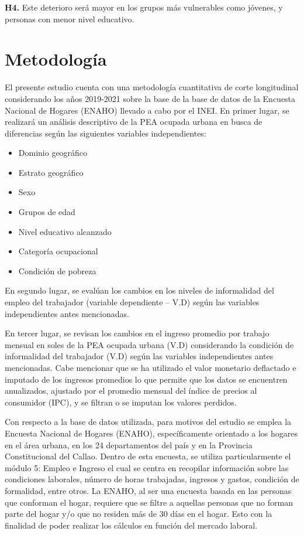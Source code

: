 \documentclass[
  letterpaper,
  12pt,
  oneside,
  spanish,
  doublespacing,
  headsepline,
  parskip]{MastersDoctoralThesis}
\begin{document}
\textbf{H4.} Este deterioro será mayor en los grupos más vulnerables
como jóvenes, y personas con menor nivel educativo.


\hypertarget{sec-metod}{%
\chapter{Metodología}\label{sec-metod}}

El presente estudio cuenta con una metodología cuantitativa de corte
longitudinal considerando los años 2019-2021 sobre la base de la base de
datos de la Encuesta Nacional de Hogares (ENAHO) llevado a cabo por el
INEI. En primer lugar, se realizará un análisis descriptivo de la PEA
ocupada urbana en busca de diferencias según las siguientes variables
independientes:

\begin{itemize}
\item
  Dominio geográfico
\item
  Estrato geográfico
\item
  Sexo
\item
  Grupos de edad
\item
  Nivel educativo alcanzado
\item
  Categoría ocupacional
\item
  Condición de pobreza
\end{itemize}

En segundo lugar, se evalúan los cambios en los niveles de informalidad
del empleo del trabajador (variable dependiente -- V.D) según las
variables independientes antes mencionadas.

En tercer lugar, se revisan los cambios en el ingreso promedio por
trabajo mensual en soles de la PEA ocupada urbana (V.D) considerando la
condición de informalidad del trabajador (V.D) según las variables
independientes antes mencionadas. Cabe mencionar que se ha utilizado el
valor monetario deflactado e imputado de los ingresos promedios lo que
permite que los datos se encuentren anualizados, ajustado por el
promedio mensual del índice de precios al consumidor (IPC), y se filtran
o se imputan los valores perdidos.

Con respecto a la base de datos utilizada, para motivos del estudio se
emplea la Encuesta Nacional de Hogares (ENAHO), específicamente
orientado a los hogares en el área urbana, en los 24 departamentos del
país y en la Provincia Constitucional del Callao. Dentro de esta
encuesta, se utiliza particularmente el módulo 5: Empleo e Ingreso el
cual se centra en recopilar información sobre las condiciones laborales,
número de horas trabajadas, ingresos y gastos, condición de formalidad,
entre otros. La ENAHO, al ser una encuesta basada en las personas que
conforman el hogar, requiere que se filtre a aquellas personas que no
forman parte del hogar y/o que no residen más de 30 días en el hogar.
Esto con la finalidad de poder realizar los cálculos en función del
mercado laboral.
\end{document}
